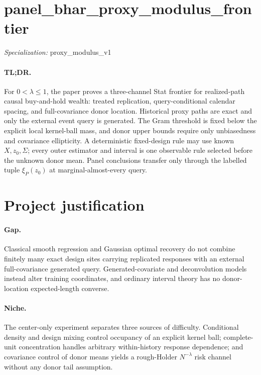 \documentclass{article}
\begin{document}
\sloppy

\section*{panel\_\allowbreak{}bhar\_\allowbreak{}proxy\_\allowbreak{}modulus\_\allowbreak{}frontier}

\noindent\textit{Specialization:} proxy\_\allowbreak{}modulus\_\allowbreak{}v1\par

\paragraph{TL;DR.} For \(0<\lambda\le1\), the paper proves a three-channel Stat frontier for realized-path causal buy-and-hold wealth: treated replication, query-conditional calendar spacing, and full-covariance donor location. Historical proxy paths are exact and only the external event query is generated. The Gram threshold is fixed below the explicit local kernel-ball mass, and donor upper bounds require only unbiasedness and covariance ellipticity. A deterministic fixed-design rule may use known \(X,z_0,\Sigma\); every outer estimator and interval is one observable rule selected before the unknown donor mean. Panel conclusions transfer only through the labelled tuple \(\xi_P(z_0)\) at marginal-almost-every query.

\section{Project justification}

\paragraph{Gap.} Classical smooth regression and Gaussian optimal recovery do not combine finitely many exact design sites carrying replicated responses with an external full-covariance generated query. Generated-covariate and deconvolution models instead alter training coordinates, and ordinary interval theory has no donor-location expected-length converse.

\paragraph{Niche.} The center-only experiment separates three sources of difficulty. Conditional density and design mixing control occupancy of an explicit kernel ball; complete-unit concentration handles arbitrary within-history response dependence; and covariance control of donor means yields a rough-Holder \(N^{-\lambda}\) risk channel without any donor tail assumption.
\end{document}
